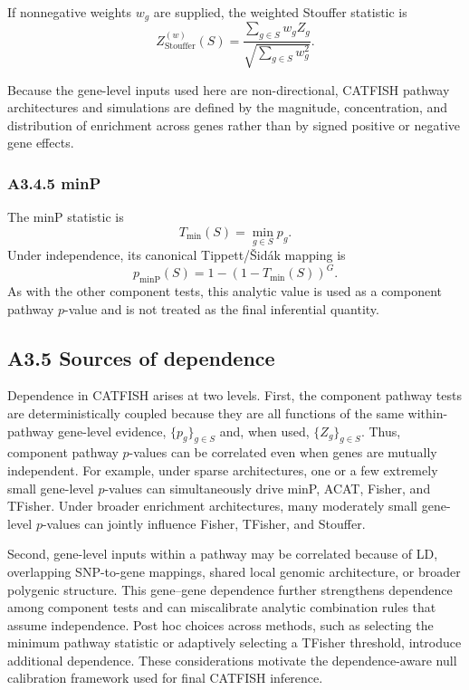 \documentclass[unnumsec,webpdf,contemporary,large]{oup-authoring-template}%
\theoremstyle{thmstyleone}%
\theoremstyle{thmstyletwo}%
\theoremstyle{thmstylethree}%
\begin{document}
\begin{appendices}
If nonnegative weights $w_g$ are supplied, the weighted Stouffer statistic is
\[
Z_{\mathrm{Stouffer}}^{(w)}(S)
=
\frac{\sum_{g\in S}w_gZ_g}
{\sqrt{\sum_{g\in S}w_g^2}}.
\]

Because the gene-level inputs used here are non-directional, CATFISH pathway architectures and simulations are defined by the magnitude, concentration, and distribution of enrichment across genes rather than by signed positive or negative gene effects.

\subsubsection{A3.4.5 minP}

The minP statistic is
\[
T_{\min}(S)
=
\min_{g\in S} p_g.
\]
Under independence, its canonical Tippett/\v{S}id\'ak mapping is
\[
p_{\mathrm{minP}}(S)
=
1-\left(1-T_{\min}(S)\right)^G.
\]
As with the other component tests, this analytic value is used as a component pathway $p$-value and is not treated as the final inferential quantity.

\subsection{A3.5 Sources of dependence}

Dependence in CATFISH arises at two levels. First, the component pathway tests are deterministically coupled because they are all functions of the same within-pathway gene-level evidence, $\{p_g\}_{g\in S}$ and, when used, $\{Z_g\}_{g\in S}$. Thus, component pathway $p$-values can be correlated even when genes are mutually independent. For example, under sparse architectures, one or a few extremely small gene-level $p$-values can simultaneously drive minP, ACAT, Fisher, and TFisher. Under broader enrichment architectures, many moderately small gene-level $p$-values can jointly influence Fisher, TFisher, and Stouffer.

Second, gene-level inputs within a pathway may be correlated because of LD, overlapping SNP-to-gene mappings, shared local genomic architecture, or broader polygenic structure. This gene--gene dependence further strengthens dependence among component tests and can miscalibrate analytic combination rules that assume independence. Post hoc choices across methods, such as selecting the minimum pathway statistic or adaptively selecting a TFisher threshold, introduce additional dependence. These considerations motivate the dependence-aware null calibration framework used for final CATFISH inference.


\end{appendices}
\end{document}
